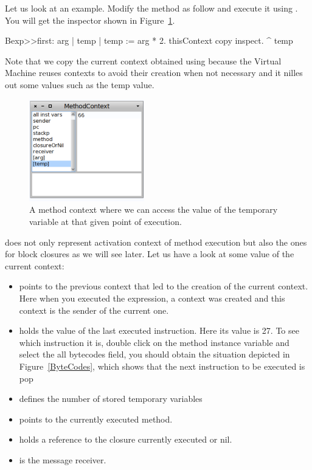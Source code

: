 \documentclass[a4paper,10pt,twoside]{book}
\begin{document}
Let us look at an example. Modify the method as follow and execute it using .
You will get the inspector shown in Figure~\ref{oneContext}.

\begin{code}
Bexp>>first: arg
	| temp |
	temp := arg * 2.
	thisContext copy inspect.
	^ temp
\end{code}

Note that we copy the current context obtained using  because the Virtual Machine reuses contexts to avoid their creation when not necessary and it nilles out some values such as the temp value.

\begin{figure}[!h]
\begin{center}\includegraphics[width=5cm]{OneContext}
\caption{A method context where we can access the value of the temporary variable  at that given point of execution.\label{oneContext}}
\end{center}
\end{figure}

 does not only represent activation context of method execution but also
the ones for block closures as we will see later. Let us have a look at some value of the current context:

\begin{itemize}
\item {} points to the previous context that led to the creation of the current context. Here when you executed the expression, a context was created and this context is the sender of the current one.

\item {} holds the value of the last executed instruction. Here its value is 27. To see which instruction it is, double click on the method instance variable and select the all bytecodes field, you should obtain the situation depicted in Figure~\ref{ByteCodes}, which shows that the next instruction to be executed is pop 

\item {} defines the number of stored temporary variables

\item {} points to the currently executed method.

\item {} holds a reference to the closure currently executed or nil.

\item {} is the message receiver.
\end{itemize}
\end{document}

